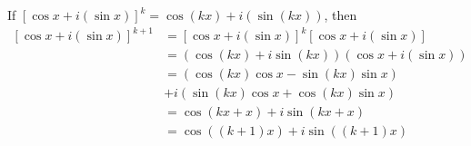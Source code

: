 \begin{enumerate}
\begin{list}{}
\end{list}
If $\left[ {\cos x + i(\sin x)} \right]^k  = \cos (kx) + i\left( {\sin (kx)} \right)$, then
\begin{align*}
\left[ {\cos x + i(\sin x)} \right]^{k+1} &= \left[ {\cos x + i(\sin x)} \right]^k \left[ {\cos x + i \left(\sin x \right)} \right] \\
  &= \left( \cos (kx) + i {\sin (kx)} \right) \left( \cos x + i \left(\sin x \right) \right) \\
  &= \left( \cos \left( kx \right) \cos x - \sin \left( kx \right) \sin x \right) \\
  &+ i \left( \sin \left( kx \right) \cos x + \cos \left( kx \right) \sin x \right)\\
  &= \cos \left(kx + x \right) + i \sin \left( kx + x \right) \\
  &= \cos \left( \left( k + 1 \right ) x \right) + i \sin \left( \left( k + 1 \right ) x \right)
\end{align*}

\end{enumerate}


\hbreak
\endinput
